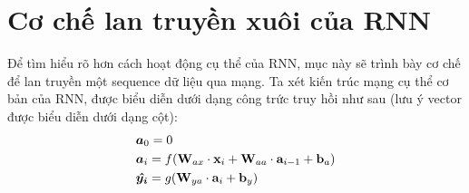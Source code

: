 \section{Cơ chế lan truyền xuôi của RNN}
Để tìm hiểu rõ hơn cách hoạt động cụ thể của RNN, mục này sẽ trình bày cơ chế để lan truyền một sequence dữ liệu qua mạng. Ta xét kiến trúc mạng cụ thể cơ bản của RNN, được biểu diễn dưới dạng công trức truy hồi như sau (lưu ý vector được biểu diễn dưới dạng cột):
\begin{align}
     & \bm a_0 = 0              \\ \nonumber
     & \bm a_i = f (\textbf W_{ax}\cdot \textbf x_i + \textbf W_{aa} \cdot \textbf a_{i-1} + \textbf b_a) \\ \nonumber
     & \bm{\hat{y_i}} = g(\textbf W_{ya} \cdot \textbf a_i + \textbf b_y) \label{rnn_equation}
\end{align}

